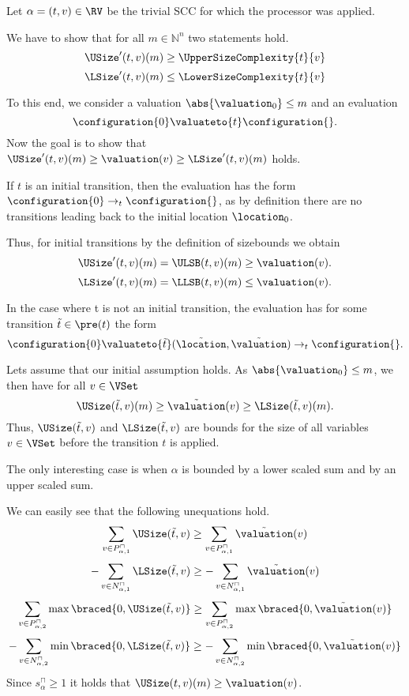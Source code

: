 Let $\alpha = (t, v) \in \RV$ be the trivial SCC for which the processor was applied.

We have to show that for all $m \in \mathbb{N}^n$ two statements hold.
\[ \USize'(t, v)(m) \geq \UpperSizeComplexity{t}{v} \]
\[ \LSize'(t, v)(m) \leq \LowerSizeComplexity{t}{v} \]

To this end, we consider a valuation $\abs{\valuation_0} \leq m$ and an evaluation
\[ \configuration{0} \valuateto{t} \configuration{} . \]
Now the goal is to show that $\USize'(t, v)(m) \geq \valuation(v) \geq \LSize'(t, v)(m)$ holds.

If $t$ is an initial transition, then the evaluation has the form $\configuration{0} \rightarrow_t \configuration{}$, as by definition there are no transitions leading back to the initial location $\location_0$.

Thus, for initial transitions by the definition of sizebounds we obtain
\[ \USize'(t, v)(m) = \ULSB(t, v)(m) \geq \valuation(v). \]
\[ \LSize'(t, v)(m) = \LLSB(t, v)(m) \leq \valuation(v). \]

In the case where t is not an initial transition, the evaluation has for some transition $\tilde{t} \in \pre(t)$ the form
\[ \configuration{0}  \valuateto{\tilde{t}} (\tilde{\location}, \tilde{\valuation}) \rightarrow_t \configuration{}. \]

Lets assume that our initial assumption holds.
As $\abs{\valuation_0} \leq m$, we then have for all $v \in \VSet$
\[ \USize(\tilde{t}, v)(m) \geq \tilde{\valuation}(v) \geq \LSize(\tilde{t}, v)(m). \]
Thus, $\USize(\tilde{t}, v)$ and $\LSize(\tilde{t}, v)$ are bounds for the size of all variables $v \in \VSet$ before the transition $t$ is applied.

The only interesting case is when $\alpha$ is bounded by a lower scaled sum and by an upper scaled sum.

We can easily see that the following unequations hold.
\[ \sum_{v \in P_{\alpha,1}^\sqcap} \USize(\tilde{t}, v) \geq \sum_{v \in P_{\alpha,1}^\sqcap} \tilde{\valuation}(v) \]
\[ - \sum_{v \in N_{\alpha,1}^\sqcap} \LSize(\tilde{t}, v) \geq - \sum_{v \in N_{\alpha,1}^\sqcap} \tilde{\valuation}(v) \]
\[ \sum_{v \in P_{\alpha,2}^\sqcap} \max \braced{0,\USize(\tilde{t}, v)} \geq \sum_{v \in P_{\alpha,2}^\sqcap} \max \braced{0,\tilde{\valuation}(v)} \]
\[ - \sum_{v \in N_{\alpha,2}^\sqcap} \min \braced{0,\LSize(\tilde{t}, v)} \geq - \sum_{v \in N_{\alpha,2}^\sqcap} \min \braced{0,\tilde{\valuation}(v)} \]
Since $s^\sqcap_\alpha \geq 1$ it holds that $\USize(t, v)(m) \geq \valuation(v)$.

